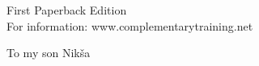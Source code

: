 {{    \vspace{2\baselineskip}
    First Paperback Edition\\
    For information: www.complementarytraining.net
    }
    \clearpage
    \thispagestyle{empty}
    \strut
    \begin{center}
        To my son Nikša
    \end{center}
    \strut
}

